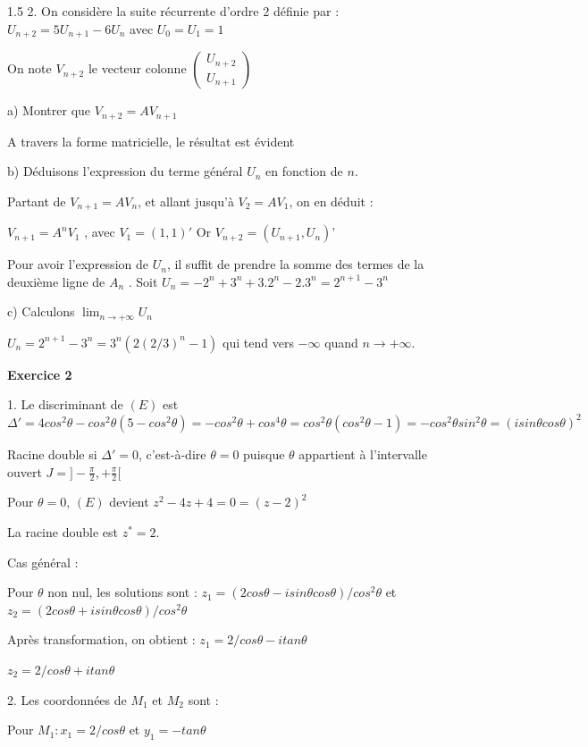 \documentclass[12pt]{article}
\begin{document}
\begin{spacing}{1.5}
2. On considère la suite récurrente d'ordre 2 définie par : 
$U_{n+2} = 5U_{n+1}-6U_n$ avec $U_0 = U_1 = 1$

On note $V_{n+2}$ le vecteur colonne  $\begin{pmatrix}
U_{n+2} \\
U_{n+1}
\end{pmatrix}$

a)  Montrer que $V_{n+2} = AV_{n+1}$

A travers la forme matricielle, le résultat est évident

b) Déduisons l'expression du terme général $U_n$ en fonction de $n$.

Partant de $V_{n+1} = AV_n$, et allant jusqu'à $V_2 = A V_1$, on en déduit : 

$V_{n+1} = A^nV_1$ , avec $V_1 = (1, 1)'$ Or $V_{n+2} = (U_{n+1}, U_{n})’$

Pour avoir l'expression de $U_n$, il suffit de prendre la somme des termes de la deuxième ligne de $A_n$
. 
Soit $U_n = -2^n+ 3^n+ 3.2^n-2.3^n
 = 2^{n+1}-3^n$
 
 c) Calculons $\lim_{n\longrightarrow +\infty}U_n$
 
$U_n = 2^{n+1}-3^n= 3^n(2(2/3)^n-1)$ qui tend vers $-\infty$ quand $n \longrightarrow +\infty$.

\medskip\textbf{Exercice 2}

1. Le discriminant de $(E)$ est $\Delta'= 4cos^2\theta-cos^2\theta(5-cos^2\theta) =-cos^2\theta + cos^4\theta=cos^2\theta(cos^2\theta-1) =-cos^2\theta sin^2\theta=(isin\theta cos\theta)^2$

Racine double si $\Delta' = 0$, c'est-à-dire $\theta =0$ puisque $\theta$ appartient à l'intervalle ouvert $J = ]-\frac{\pi}{2}, + \frac{\pi}{2}[$

Pour $\theta = 0$, $(E)$ devient $z^2-4z + 4 = 0 = (z-2)^2$

La racine double est $z^* = 2$. 

Cas général : 

Pour $\theta$ non nul, les solutions sont : 
$z_1 = (2cos\theta-isin\theta cos\theta)/cos^2\theta$ 
et $z_2 = (2cos\theta + isin\theta cos\theta)/cos^2\theta$

Après transformation, on obtient : 
$z_1 = 2/cos\theta-itan\theta$

$z_2 = 2/cos\theta + itan\theta$

2. Les coordonnées de $M_1$ et $M_2$ sont : 

Pour $M_1 : x_1 = 2/cos\theta$ et $y_1 =-tan\theta$


\end{spacing}
\end{document}
